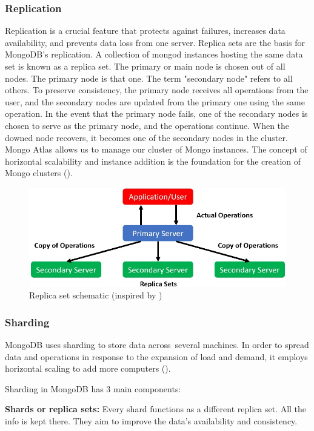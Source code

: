 \subsubsection{Replication}
Replication is a crucial feature that protects against failures, increases data availability, and prevents data loss from one server.
Replica sets are the basis for MongoDB's replication. A collection of mongod instances hosting the same data set is known as a replica set. The primary or main node is chosen out of all nodes. The primary node is that one. The term "secondary node" refers to all others. To preserve consistency, the primary node receives all operations from the user, and the secondary nodes are updated from the primary one using the same operation. In the event that the primary node fails, one of the secondary nodes is chosen to serve as the primary node, and the operations continue. When the downed node recovers, it becomes one of the secondary nodes in the cluster. Mongo Atlas allows us to manage our cluster of Mongo instances. The concept of horizontal scalability and instance addition is the foundation for the creation of Mongo clusters (\cite{roy_databases_2020}). 
\begin{figure}[H]
    \centering
    \includegraphics[width=1.0\textwidth]{images/Replica_Sets.jpeg}
        \caption{Replica set schematic (inspired by \cite{roy_databases_2020})}
    \label{fig:Replica Sets}
\end{figure}

\subsubsection{Sharding}
MongoDB uses sharding to store data across several machines. In order to spread data and operations in response to the expansion of load and demand, it employs horizontal scaling to add more computers (\cite{roy_databases_2020}).

Sharding in MongoDB has 3 main components:

\textbf{Shards or replica sets:} Every shard functions as a different replica set. All the info is kept there. They aim to improve the data's availability and consistency.

